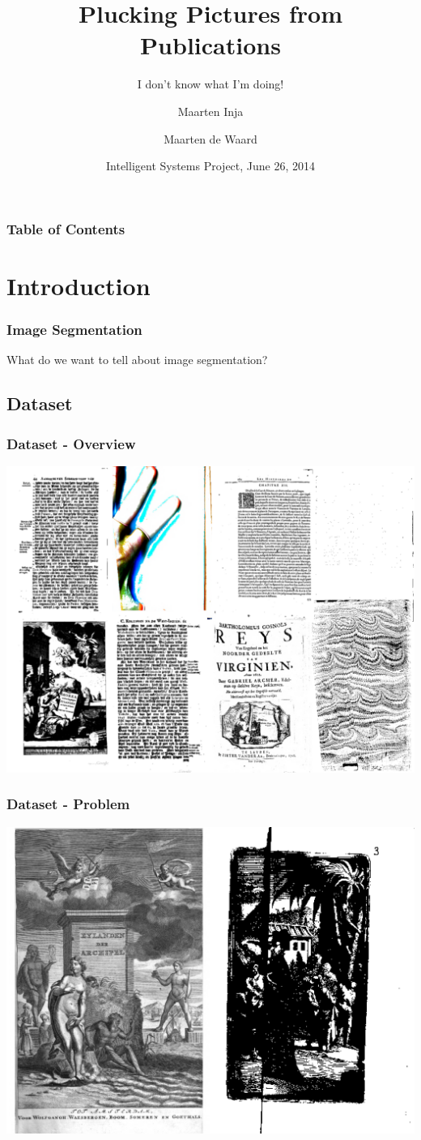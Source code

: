 \documentclass{beamer}
\title{Plucking Pictures from Publications}
\subtitle{I don't know what I'm doing!}
\author{Maarten Inja \and Maarten de Waard}
\institute[UvA]{University of Amsterdam}
\date[2014]{Intelligent Systems Project, June 26, 2014}
\newcommand{\slide}[2]
{
\begin{frame}
\frametitle{#1} 

#2

\end{frame}
}
\begin{document}
\begin{frame}
\titlepage
\end{frame}

\slide{Table of Contents}
{
	\tableofcontents
}

\section{Introduction}
\slide{Image Segmentation}
{
	What do we want to tell about image segmentation?
}
\subsection{Dataset}
\slide{Dataset - Overview}
{
	\includegraphics[width=.8\paperwidth]{resources/example1}
}
\slide{Dataset - Problem}
{
	\includegraphics[width=.8\paperwidth]{resources/example2}
}
\end{document}
